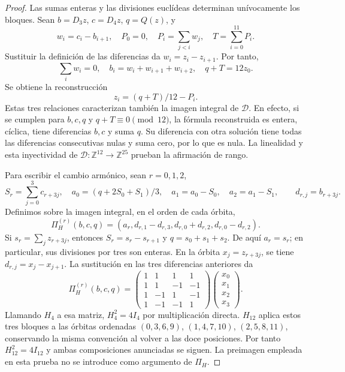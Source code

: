 \begin{proof}
Las sumas enteras y las divisiones euclídeas determinan unívocamente
los bloques. Sean \(b=D_3z\), \(c=D_4z\), \(q=Q(z)\), y
\[
 w_i=c_i-b_{i+1},\quad P_0=0,\quad
 P_i=\sum_{j<i}w_j,\quad T=\sum_{i=0}^{11}P_i.
\]
Sustituir la definición de las diferencias da
\(w_i=z_i-z_{i+1}\). Por tanto,
\[
 \sum_iw_i=0,\quad b_i=w_i+w_{i+1}+w_{i+2},\quad
 q+T=12z_0.
\]
Se obtiene la reconstrucción
\[
 z_i=(q+T)/12-P_i.
\]
Estas tres relaciones caracterizan también la imagen integral de
\(\mathcal D\). En efecto, si se cumplen para \(b,c,q\) y
\(q+T\equiv0\pmod{12}\), la fórmula reconstruida es entera,
cíclica, tiene diferencias \(b,c\) y suma \(q\). Su diferencia
con otra solución tiene todas las diferencias consecutivas nulas y
suma cero, por lo que es nula. La linealidad y esta inyectividad de
\(\mathcal D\colon\mathbb Z^{12}\to\mathbb Z^{25}\) prueban
la afirmación de rango.

Para escribir el cambio armónico, sean \(r=0,1,2\),
\[
 S_r=\sum_{j=0}^3c_{r+3j},\quad
 a_0=(q+2S_0+S_1)/3,\quad
 a_1=a_0-S_0,\quad a_2=a_1-S_1,
 \qquad d_{r,j}=b_{r+3j}.
\]
Definimos sobre la imagen integral, en el orden de cada órbita,
\[
 \Pi_H^{(r)}(b,c,q)=
 (a_r,d_{r,1}-d_{r,3},d_{r,0}+d_{r,2},d_{r,0}-d_{r,2}).
\]
Si \(s_r=\sum_jz_{r+3j}\), entonces
\(S_r=s_r-s_{r+1}\) y \(q=s_0+s_1+s_2\). De aquí
\(a_r=s_r\); en particular, sus divisiones por tres son enteras.
En la órbita \(x_j=z_{r+3j}\), se tiene \(d_{r,j}=x_j-x_{j+1}\).
La sustitución en las tres diferencias anteriores da
\[
 \Pi_H^{(r)}(b,c,q)=
 \begin{pmatrix}
 1&1&1&1\\1&1&-1&-1\\
 1&-1&1&-1\\1&-1&-1&1
 \end{pmatrix}
 \begin{pmatrix}x_0\\x_1\\x_2\\x_3\end{pmatrix}.
\]
Llamando \(H_4\) a esa matriz, \(H_4^2=4I_4\) por
multiplicación directa. \(H_{12}\) aplica estos tres bloques a las
órbitas ordenadas \((0,3,6,9)\), \((1,4,7,10)\),
\((2,5,8,11)\), conservando la misma convención al volver a las
doce posiciones. Por tanto \(H_{12}^2=4I_{12}\) y ambas
composiciones anunciadas se siguen. La preimagen empleada en esta
prueba no se introduce como argumento de \(\Pi_H\).
\end{proof}

